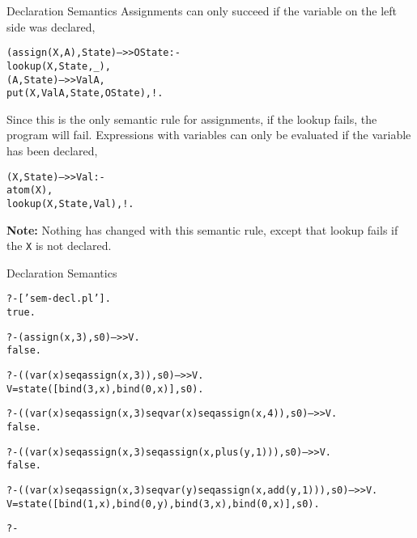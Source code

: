\documentclass{beamer}
\begin{document}
\begin{frame}[fragile]{\large Declaration Semantics}
Assignments can only succeed if the variable on the left side was declared,

\vspace{.1in}

{\tiny
\begin{alltt}
(assign(X,A),State) -->> OState :-     % assignment
    lookup(X,State,_),	      	       % only allowed to assign	to variables
    (A,State) -->> ValA,      	       % that have been	declared
    put(X,ValA,State,OState),!.
\end{alltt}
}

\vspace{.1in}

Since this is the only semantic rule for assignments, if the lookup fails, the program will fail.
Expressions with variables can only be evaluated if the variable has been declared,

\vspace{.1in}

{\tiny
\begin{alltt}
(X,State) -->> Val :-              % variables
    atom(X),
    lookup(X,State,Val),!.
\end{alltt}
}

\vspace{.1in}

{\bf Note:} Nothing has changed with this semantic rule, except that lookup fails if the {\tt X} is not declared.

\end{frame}

\begin{frame}[fragile]{\large Declaration Semantics}
\tiny
\begin{alltt}
?- ['sem-decl.pl'].
%   xis.pl compiled 0.00 sec, 6,920 bytes
%  preamble.pl compiled 0.00 sec, 8,084 bytes
%  xis.pl compiled 0.01 sec, 148 bytes
% sem-decl.pl compiled 0.01 sec, 14,948 bytes
true.

?- (assign(x, 3),s0)-->>V.
false.

?- ((var(x) seq assign(x, 3)),s0)-->>V.
V = state([bind(3, x), bind(0, x)], s0).

?- ((var(x) seq assign(x, 3) seq var(x) seq assign(x, 4)),s0)-->>V.
false.

?- ((var(x) seq assign(x, 3) seq assign(x, plus(y, 1))),s0)-->>V.
false.

?- ((var(x) seq assign(x, 3) seq var(y) seq assign(x, add(y, 1))),s0)-->>V. 
V = state([bind(1, x), bind(0, y), bind(3, x), bind(0, x)], s0).

?- 

\end{alltt}
\end{frame}
\end{document}
